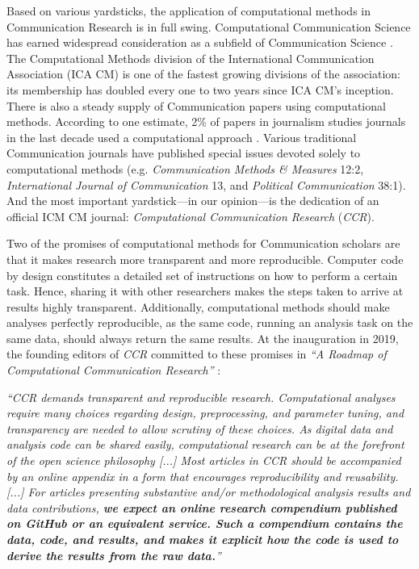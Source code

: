 

Based on various yardsticks, the application of computational methods in Communication Research is in full swing. Computational Communication Science has earned widespread consideration as a subfield of Communication Science \parencite[]{hilbert2019computational}. The Computational Methods division of the International Communication Association (ICA CM) is one of the fastest growing divisions of the association: its membership has doubled every one to two years since ICA CM's inception. There is also a steady supply of Communication papers using computational methods. According to one estimate, 2\% of papers in journalism studies journals in the last decade used a computational approach \parencite{zeng:2023:EMI}. Various traditional Communication journals have published special issues devoted solely to computational methods (e.g. \textit{Communication Methods \& Measures} 12:2, \textit{International Journal of Communication} 13, and \textit{Political Communication} 38:1). And the most important yardstick---in our opinion---is the dedication of an official ICM CM journal: \textit{Computational Communication Research} (\textit{CCR}).

Two of the promises of computational methods for Communication scholars are that it makes research more transparent and more reproducible.
Computer code by design constitutes a detailed set of instructions on how to perform a certain task.
Hence, sharing it with other researchers makes the steps taken to arrive at results highly transparent.
Additionally, computational methods should make analyses perfectly reproducible, as the same code, running an analysis task on the same data, should always return the same results.
At the inauguration in 2019, the founding editors of \textit{CCR} committed to these promises in \textit{``A Roadmap of Computational Communication Research''} \parencite[][\textit{Roadmap I} hereinafter, emphasis added]{ccrintro}:

\begin{displayquote}
\textit{``CCR demands transparent and reproducible research. Computational analyses require many choices regarding design, preprocessing, and parameter tuning, and transparency are needed to allow scrutiny of these choices. As digital data and analysis code can be shared easily, computational research can be at the forefront of the open science philosophy [...] Most articles in \textit{CCR} should be accompanied by an online appendix in a form that encourages reproducibility and reusability. [...] For articles presenting substantive and/or methodological analysis results and data contributions, \textbf{we expect an online research compendium published on GitHub or an equivalent service. Such a compendium contains the data, code, and results, and makes it explicit how the code is used to derive the results from the raw data.}''}
\end{displayquote}

